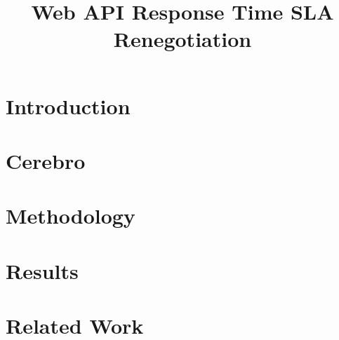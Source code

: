 \documentclass[conference,compsoc]{IEEEtran}
\begin{document}
%
\title{Web API Response Time SLA Renegotiation}

\author{
}

\maketitle


\begin{abstract}

\end{abstract}

\vspace{-0.1in}
\section{Introduction}
\vspace{-0.1in}
\label{sec:intro}


\vspace{-0.1in}
\section{Cerebro}
\vspace{-0.1in}
\label{sec:cerebro}


\vspace{-0.1in}
\section{Methodology}
\vspace{-0.1in}
\label{sec:methodology}


\vspace{-0.1in}
\section{Results}
\vspace{-0.1in}
\label{sec:results}


\vspace{-0.1in}
\section{Related Work}
\vspace{-0.1in}
\label{sec:related_work}

\end{document}
